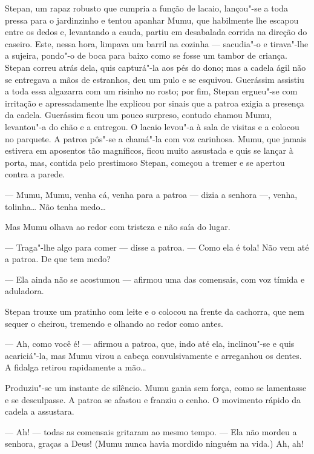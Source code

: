 Stepan, um rapaz robusto que cumpria a função de lacaio, lançou"-se a
toda pressa para o jardinzinho e tentou apanhar Mumu, que habilmente lhe
escapou entre os dedos e, levantando a cauda, partiu em desabalada
corrida na direção do caseiro. Este, nessa hora, limpava um barril
na cozinha --- sacudia"-o e tirava"-lhe a sujeira, pondo"-o de boca para
baixo como se fosse um tambor de criança. Stepan correu atrás dela, quis
capturá"-la aos pés do dono; mas a cadela ágil não se entregava a mãos de
estranhos, deu um pulo e se esquivou. Guerássim assistiu a toda essa
algazarra com um risinho no rosto; por fim, Stepan ergueu"-se com
irritação e apressadamente lhe explicou por sinais que a patroa exigia a
presença da cadela. Guerássim ficou um pouco surpreso, contudo chamou
Mumu, levantou"-a do chão e a entregou. O lacaio levou"-a à sala de visitas
e a colocou no parquete. A patroa pôs"-se a chamá"-la com voz carinhosa.
Mumu, que jamais estivera em aposentos tão magníficos, ficou muito
assustada e quis se lançar à porta, mas, contida pelo prestimoso Stepan,
começou a tremer e se apertou contra a parede.

--- Mumu, Mumu, venha cá, venha para a patroa --- dizia a senhora ---,
venha, tolinha\ldots{} Não tenha medo\ldots{}


Mas Mumu olhava ao redor com tristeza e não saía do lugar.

--- Traga"-lhe algo para comer --- disse a patroa. --- Como ela é tola!
Não vem até a patroa. De que tem medo?

--- Ela ainda não se acostumou --- afirmou uma das comensais, com voz
tímida e aduladora.

Stepan trouxe um pratinho com leite e o colocou na frente da cachorra, que
nem sequer o cheirou, tremendo e olhando ao redor como antes.

--- Ah, como você é! --- afirmou a patroa, que, indo até ela, inclinou"-se
e quis acariciá"-la, mas Mumu virou a cabeça convulsivamente e arreganhou
os dentes. A fidalga retirou rapidamente a mão\ldots{}

Produziu"-se um instante de silêncio. Mumu gania sem força, como se
lamentasse e se desculpasse. A patroa se afastou e franziu o cenho. O
movimento rápido da cadela a assustara.

--- Ah! --- todas as comensais gritaram ao mesmo tempo. --- Ela não
mordeu a senhora, graças a Deus! (Mumu nunca havia mordido ninguém na vida.) Ah, ah!


